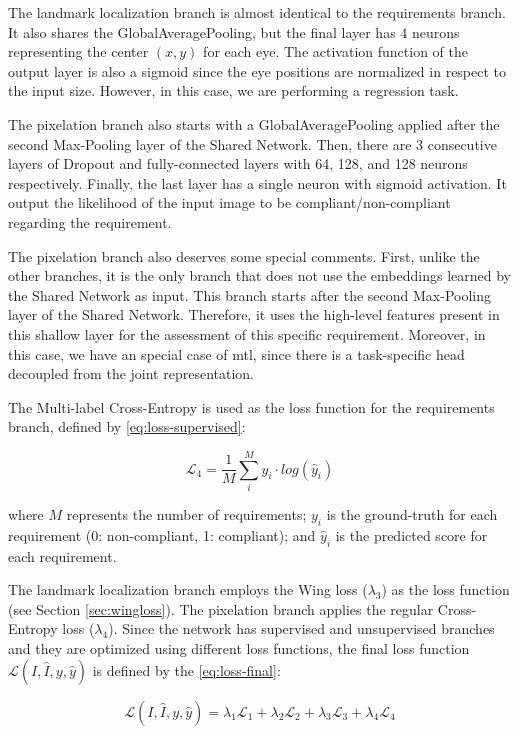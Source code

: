 The landmark localization branch is almost identical to the requirements branch. It also shares the GlobalAveragePooling, but the final layer has 4 neurons representing the center $(x, y)$ for each eye. The activation function of the output layer is also a sigmoid since the eye positions are normalized in respect to the input size. However, in this case, we are performing a regression task.

The pixelation branch also starts with a GlobalAveragePooling applied after the second Max-Pooling layer of the Shared Network. Then, there are 3 consecutive layers of Dropout and fully-connected layers with 64, 128, and 128 neurons respectively. Finally, the last layer has a single neuron with sigmoid activation. It output the likelihood of the input image to be compliant/non-compliant regarding the \pixelation requirement.

The pixelation branch also deserves some special comments. First, unlike the other branches, it is the only branch that does not use the embeddings learned by the Shared Network as input. This branch starts after the second Max-Pooling layer of the Shared Network. Therefore, it uses the high-level features present in this shallow layer for the assessment of this specific requirement. Moreover, in this case, we have an special case of \acl{mtl}, since there is a task-specific head decoupled from the joint representation.

The Multi-label Cross-Entropy is used as the loss function for the requirements branch, defined by \autoref{eq:loss-supervised}:

\begin{equation}
\label{eq:loss-supervised}
\mathcal{L}_4 = \frac{1}{M} \sum_i^M {y_i \cdot log(\hat{y}_i)}
\end{equation}

\noindent where $M$ represents the number of requirements; $y_i$ is the ground-truth for each requirement (0: non-compliant, 1: compliant); and $\hat{y}_i$ is the predicted score for each requirement.

The landmark localization branch employs the Wing loss ($\lambda_3$) as the loss function (see Section \ref{sec:wingloss}). The pixelation branch applies the regular Cross-Entropy loss ($\lambda_4$). Since the network has supervised and unsupervised branches and they are optimized using different loss functions, the final loss function $\mathcal{L}(I, \hat{I}, y, \hat{y})$ is defined by the \autoref{eq:loss-final}:

\begin{equation}
\label{eq:loss-final}
\mathcal{L}(I, \hat{I}, y, \hat{y}) = \lambda_1\mathcal{L}_1 + \lambda_2\mathcal{L}_2 + \lambda_3\mathcal{L}_3 + \lambda_4\mathcal{L}_4
\end{equation}


